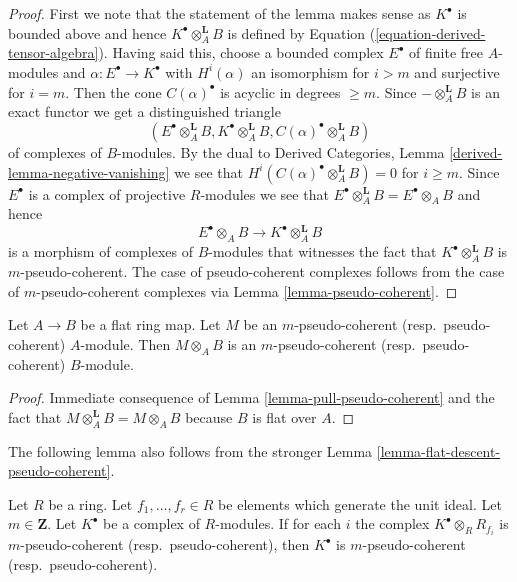 \begin{proof}
First we note that the statement of the lemma makes sense as
$K^\bullet$ is bounded above and hence $K^\bullet \otimes_A^{\mathbf{L}} B$
is defined by Equation (\ref{equation-derived-tensor-algebra}).
Having said this, choose a bounded complex $E^\bullet$
of finite free $A$-modules and $\alpha : E^\bullet \to K^\bullet$
with $H^i(\alpha)$ an isomorphism for $i > m$ and surjective for
$i = m$. Then the cone $C(\alpha)^\bullet$ is acyclic in degrees
$\geq m$. Since $-\otimes_A^{\mathbf{L}} B$ is an exact functor
we get a distinguished triangle
$$
(E^\bullet \otimes_A^{\mathbf{L}} B, K^\bullet \otimes_A^{\mathbf{L}} B,
C(\alpha)^\bullet \otimes_A^{\mathbf{L}} B)
$$
of complexes of $B$-modules. By the dual to
Derived Categories, Lemma \ref{derived-lemma-negative-vanishing}
we see that $H^i(C(\alpha)^\bullet \otimes_A^{\mathbf{L}} B) = 0$
for $i \geq m$. Since $E^\bullet$ is a complex of projective $R$-modules
we see that $E^\bullet \otimes_A^{\mathbf{L}} B = E^\bullet \otimes_A B$
and hence
$$
E^\bullet \otimes_A B
\longrightarrow
K^\bullet \otimes_A^{\mathbf{L}} B
$$
is a morphism of complexes of $B$-modules that witnesses the
fact that $K^\bullet \otimes_A^{\mathbf{L}} B$ is $m$-pseudo-coherent.
The case of pseudo-coherent complexes follows from the case
of $m$-pseudo-coherent complexes via
Lemma \ref{lemma-pseudo-coherent}.
\end{proof}

\begin{lemma}
\label{lemma-flat-base-change-pseudo-coherent}
Let $A \to B$ be a flat ring map.
Let $M$ be an $m$-pseudo-coherent (resp.\ pseudo-coherent)
$A$-module. Then $M \otimes_A B$
is an $m$-pseudo-coherent (resp.\ pseudo-coherent) $B$-module.
\end{lemma}

\begin{proof}
Immediate consequence of
Lemma \ref{lemma-pull-pseudo-coherent}
and the fact that $M \otimes_A^{\mathbf{L}} B = M \otimes_A B$
because $B$ is flat over $A$.
\end{proof}

\noindent
The following lemma also follows from the stronger
Lemma \ref{lemma-flat-descent-pseudo-coherent}.

\begin{lemma}
\label{lemma-glue-pseudo-coherent}
Let $R$ be a ring. Let $f_1, \ldots, f_r \in R$ be elements which
generate the unit ideal. Let $m \in \mathbf{Z}$. Let $K^\bullet$
be a complex of $R$-modules. If for each $i$ the complex
$K^\bullet \otimes_R R_{f_i}$ is $m$-pseudo-coherent
(resp.\ pseudo-coherent), then $K^\bullet$ is $m$-pseudo-coherent
(resp.\ pseudo-coherent).
\end{lemma}

